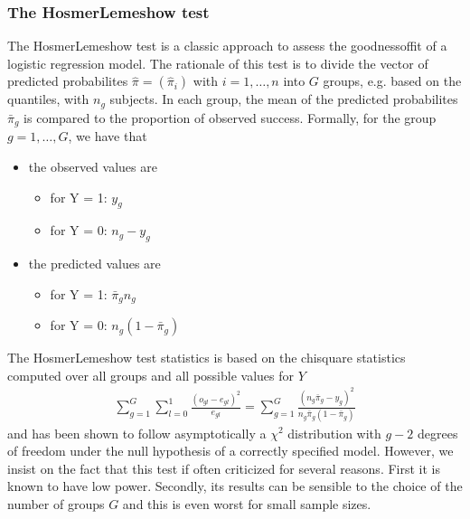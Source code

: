 \documentclass[letterpaper,10pt,english]{jupyterBook}
\begin{document}
\subsubsection{The Hosmer\sphinxhyphen{}Lemeshow test}
\label{\detokenize{15.j. Logistic Regression:the-hosmer-lemeshow-test}}
\sphinxAtStartPar
The Hosmer\sphinxhyphen{}Lemeshow test is a classic approach to assess the goodness\sphinxhyphen{}of\sphinxhyphen{}fit of a logistic regression model. The rationale of this test is to divide the vector of predicted probabilites \(\hat{\pi} = (\hat{\pi}_i)\) with \(i=1,\dots,n\) into \(G\) groups, e.g. based on the quantiles, with \(n_g\) subjects. In each group, the mean of the predicted probabilites \(\bar{\pi}_g\) is compared to the proportion of observed success. Formally, for the group \(g=1,\dots,G\), we have that
\begin{itemize}
\item {} 
\sphinxAtStartPar
the observed values are
\begin{itemize}
\item {} 
\sphinxAtStartPar
for Y = 1: \(y_g\)

\item {} 
\sphinxAtStartPar
for Y = 0: \(n_g - y_g\)

\end{itemize}

\item {} 
\sphinxAtStartPar
the predicted values are
\begin{itemize}
\item {} 
\sphinxAtStartPar
for Y = 1: \(\bar{\pi}_gn_g\)

\item {} 
\sphinxAtStartPar
for Y = 0: \(n_g(1 - \bar{\pi}_g)\)

\end{itemize}

\end{itemize}

\sphinxAtStartPar
The Hosmer\sphinxhyphen{}Lemeshow test statistics is based on the chi\sphinxhyphen{}square statistics computed over all groups and all possible values for \(Y\)
\begin{equation*}
\begin{split}\sum_{g=1}^G\sum_{l=0}^1 \frac{(o_{gl} - e_{gl})^2}{e_{gl}} = \sum_{g=1}^G \frac{(n_g\bar{\pi}_g - y_g)^2}{n_g\bar{\pi}_g(1-\bar{\pi}_g)}\end{split}
\end{equation*}
\sphinxAtStartPar
and has been shown to follow asymptotically a \(\chi^2\) distribution with \(g-2\) degrees of freedom under the null hypothesis of a correctly specified model. However, we insist on the fact that this test if often criticized for several reasons. First it is known to have low power. Secondly, its results can be sensible to the choice of the number of groups \(G\) and this is even worst for small sample sizes.
\end{document}
